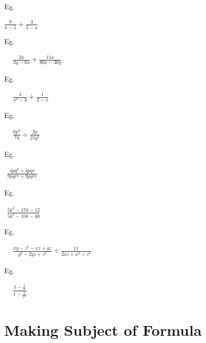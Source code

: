 \documentclass[twocolumn]{article}
\begin{document}
\bigskip 

\noindent 
Eg. 

\noindent 
$ \frac{9}{x-5}+\frac{3}{5-x} $

 

\noindent 
Eg. 

\noindent 
$\begin{aligned} & \frac{2 x}{3 y-8 x}+\frac{11 x}{80 x-30 y}  \end{aligned}$

\bigskip 

\noindent 
Eg. 

\noindent 
$\begin{aligned} & \frac{4}{x^2-4}+\frac{1}{2-x}  \end{aligned}$

\bigskip 

\noindent 
Eg. 

\noindent 
$\begin{aligned} & \frac{6 p^3}{7 q} \div \frac{2 p}{21 q^2} \end{aligned}$

\bigskip 

\noindent 
Eg. 

\noindent 
$\begin{aligned} \frac{4 p q^2+4 p q r}{9 p q r^2+9 p q^2 r} \end{aligned}$

 
\noindent 
Eg. 

\noindent 
$\begin{aligned} \frac{5 k^2-17 k-12}{5 k^2-10 k-40}  \end{aligned}$

\bigskip 

\noindent 
Eg. 

\noindent 
$\begin{aligned} & \frac{x y-z^2-x z+y z}{y^2-2 y z+z^2} \div \frac{11}{2 x z+x^2+z^2}  \end{aligned}$

\bigskip 

\noindent 
Eg. 

\noindent 
$\begin{aligned} & \frac{1-\frac{1}{x}}{1-\frac{1}{x^2}}  \end{aligned}$

\section*{Making Subject of Formula}

\bigskip 
\end{document}
